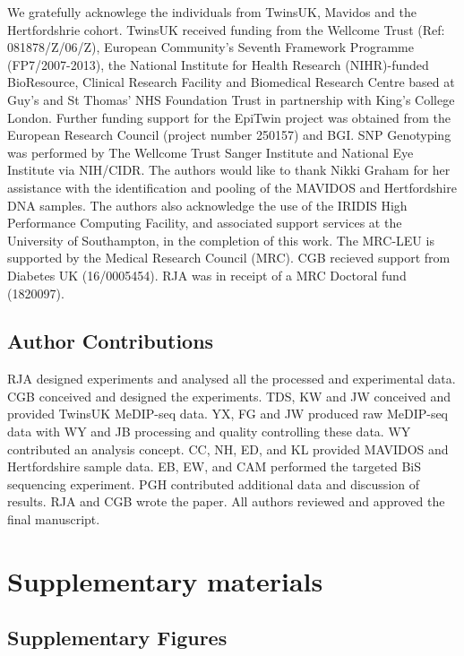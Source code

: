 \documentclass[]{book}
\begin{document}
We gratefully acknowlege the individuals from TwinsUK, Mavidos and the Hertfordshrie cohort.
TwinsUK received funding from the Wellcome Trust (Ref: 081878/Z/06/Z), European Community's Seventh Framework Programme (FP7/2007-2013), the National Institute for Health Research (NIHR)-funded BioResource, Clinical Research Facility and Biomedical Research Centre based at Guy's and St Thomas' NHS Foundation Trust in partnership with King's College London.
Further funding support for the EpiTwin project was obtained from the European Research Council (project number 250157) and BGI.
SNP Genotyping was performed by The Wellcome Trust Sanger Institute and National Eye Institute via NIH/CIDR.
The authors would like to thank Nikki Graham for her assistance with the identification and pooling of the MAVIDOS and Hertfordshire DNA samples.
The authors also acknowledge the use of the IRIDIS High Performance Computing Facility, and associated support services at the University of Southampton, in the completion of this work.
The MRC-LEU is supported by the Medical Research Council (MRC).
CGB recieved support from Diabetes UK (16/0005454).
RJA was in receipt of a MRC Doctoral fund (1820097).

\hypertarget{author-contributions}{%
\subsection{Author Contributions}\label{author-contributions}}

RJA designed experiments and analysed all the processed and experimental data.
CGB conceived and designed the experiments.
TDS, KW and JW conceived and provided TwinsUK MeDIP-seq data.
YX, FG and JW produced raw MeDIP-seq data with WY and JB processing and quality controlling these data.
WY contributed an analysis concept.
CC, NH, ED, and KL provided MAVIDOS and Hertfordshire sample data.
EB, EW, and CAM performed the targeted BiS sequencing experiment.
PGH contributed additional data and discussion of results.
RJA and CGB wrote the paper.
All authors reviewed and approved the final manuscript.

\newpage

\hypertarget{supplementary-materials}{%
\section*{Supplementary materials}\label{supplementary-materials}}

\hypertarget{supplementary-figures}{%
\subsection{Supplementary Figures}\label{supplementary-figures}}
\end{document}
